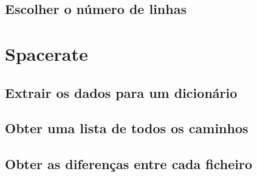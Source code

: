 \subsection{Escolher o número de linhas}

\section{Spacerate}

\subsection{Extrair os dados para um dicionário}

\subsection{Obter uma lista de todos os caminhos}

\subsection{Obter as diferenças entre cada ficheiro}

